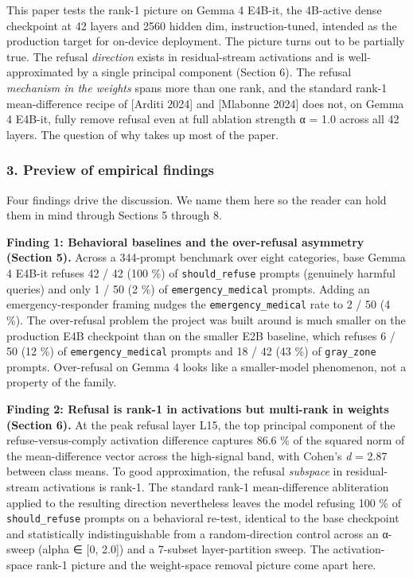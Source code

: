 \documentclass[
  11pt,
]{article}
\begin{document}
This paper tests the rank-1 picture on Gemma 4 E4B-it, the 4B-active
dense checkpoint at 42 layers and 2560 hidden dim, instruction-tuned,
intended as the production target for on-device deployment. The picture
turns out to be partially true. The refusal \emph{direction} exists in
residual-stream activations and is well-approximated by a single
principal component (Section 6). The refusal \emph{mechanism in the
weights} spans more than one rank, and the standard rank-1
mean-difference recipe of {[}Arditi 2024{]} and {[}Mlabonne 2024{]} does
not, on Gemma 4 E4B-it, fully remove refusal even at full ablation
strength α = 1.0 across all 42 layers. The question of why takes up most
of the paper.

\subsubsection{3. Preview of empirical
findings}\label{preview-of-empirical-findings}

Four findings drive the discussion. We name them here so the reader can
hold them in mind through Sections 5 through 8.

\textbf{Finding 1: Behavioral baselines and the over-refusal asymmetry
(Section 5).} Across a 344-prompt benchmark over eight categories, base
Gemma 4 E4B-it refuses 42 / 42 (100 \%) of \texttt{should\_refuse}
prompts (genuinely harmful queries) and only 1 / 50 (2 \%) of
\texttt{emergency\_medical} prompts. Adding an emergency-responder
framing nudges the \texttt{emergency\_medical} rate to 2 / 50 (4 \%).
The over-refusal problem the project was built around is much smaller on
the production E4B checkpoint than on the smaller E2B baseline, which
refuses 6 / 50 (12 \%) of \texttt{emergency\_medical} prompts and 18 /
42 (43 \%) of \texttt{gray\_zone} prompts. Over-refusal on Gemma 4 looks
like a smaller-model phenomenon, not a property of the family.

\textbf{Finding 2: Refusal is rank-1 in activations but multi-rank in
weights (Section 6).} At the peak refusal layer L15, the top principal
component of the refuse-versus-comply activation difference captures
86.6 \% of the squared norm of the mean-difference vector across the
high-signal band, with Cohen's \emph{d} = 2.87 between class means. To
good approximation, the refusal \emph{subspace} in residual-stream
activations is rank-1. The standard rank-1 mean-difference abliteration
applied to the resulting direction nevertheless leaves the model
refusing 100 \% of \texttt{should\_refuse} prompts on a behavioral
re-test, identical to the base checkpoint and statistically
indistinguishable from a random-direction control across an α-sweep
(alpha ∈ {[}0, 2.0{]}) and a 7-subset layer-partition sweep. The
activation-space rank-1 picture and the weight-space removal picture
come apart here.
\end{document}
